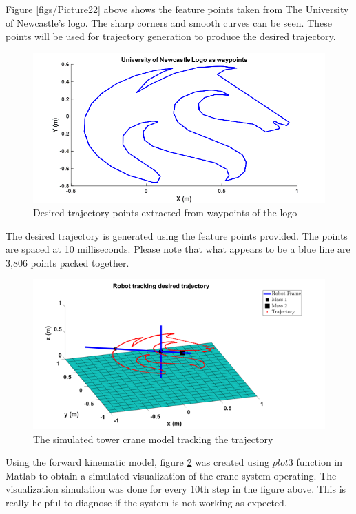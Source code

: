 \documentclass{UoNMCHA}
\numberwithin{equation}{section}
\begin{document}
	Figure \ref{figs/Picture22} above shows the feature points taken from The University of Newcastle's logo. The sharp corners and smooth curves can be seen. These points will be used for trajectory generation to produce the desired trajectory. 
	
	\begin{figure}[H]
		\begin{center}
			\includegraphics[width=.8\linewidth]{figs/Picture23}
			\caption{Desired trajectory points extracted from waypoints of the logo}
			\label{figs/Picture23}
		\end{center}
	\end{figure}
	
	The desired trajectory is generated using the feature points provided. The points are spaced at 10 milliseconds. Please note that what appears to be a blue line are 3,806 points packed together.
	
	\begin{figure}[H]
		\begin{center}
			\includegraphics[width=.9\linewidth]{figs/Picture24}
			\caption{The simulated tower crane model tracking the trajectory}
			\label{figs/Picture24}
		\end{center}
	\end{figure}
	
	Using the forward kinematic model, figure \ref{figs/Picture24} was created using $ plot3 $ function in Matlab to obtain a simulated visualization of the crane system operating. The visualization simulation was done for every 10th step in the figure above. This is really helpful to diagnose if the system is not working as expected. 
	
\end{document}
